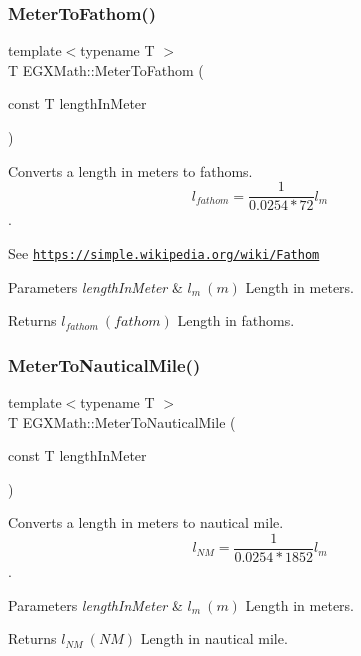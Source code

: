 \subsubsection{\texorpdfstring{Meter\+To\+Fathom()}{MeterToFathom()}}
{\footnotesize\ttfamily template$<$typename T $>$ \\
T E\+G\+X\+Math\+::\+Meter\+To\+Fathom (\begin{DoxyParamCaption}\item[{const T}]{length\+In\+Meter }\end{DoxyParamCaption})}



Converts a length in meters to fathoms. \[ l_{fathom}= \frac{1}{0.0254 * 72} l_{m} \]. 

See \href{https://simple.wikipedia.org/wiki/Fathom}{\tt https\+://simple.\+wikipedia.\+org/wiki/\+Fathom} 
\begin{DoxyParams}{Parameters}
{\em length\+In\+Meter} & $ l_{m}\ (m)$ Length in meters. \\
\hline
\end{DoxyParams}
\begin{DoxyReturn}{Returns}
$ l_{fathom}\ (fathom)$ Length in fathoms. 
\end{DoxyReturn}
\mbox{\label{group___e_g_x_math-_conversions-_length_conversions-_s_i-_meter-_nautical_ga501f0dd53cb3c21d377eac2a18fabdf8}} 
\subsubsection{\texorpdfstring{Meter\+To\+Nautical\+Mile()}{MeterToNauticalMile()}}
{\footnotesize\ttfamily template$<$typename T $>$ \\
T E\+G\+X\+Math\+::\+Meter\+To\+Nautical\+Mile (\begin{DoxyParamCaption}\item[{const T}]{length\+In\+Meter }\end{DoxyParamCaption})}



Converts a length in meters to nautical mile. \[ l_{NM}= \frac{1}{0.0254 * 1852} l_{m} \]. 


\begin{DoxyParams}{Parameters}
{\em length\+In\+Meter} & $ l_{m}\ (m)$ Length in meters. \\
\hline
\end{DoxyParams}
\begin{DoxyReturn}{Returns}
$ l_{NM}\ (NM)$ Length in nautical mile. 
\end{DoxyReturn}
